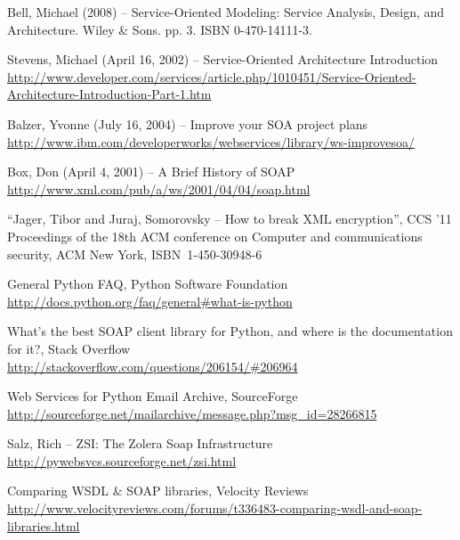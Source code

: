 

%
%

%
%


\begin{thebibliography}{99}

Bell, Michael (2008) -- Service-Oriented Modeling: Service Analysis, Design, and Architecture. Wiley & Sons. pp. 3. ISBN 0-470-14111-3.

Stevens, Michael (April 16, 2002) -- Service-Oriented Architecture Introduction
\url{http://www.developer.com/services/article.php/1010451/Service-Oriented-Architecture-Introduction-Part-1.htm}

Balzer, Yvonne (July 16, 2004) -- Improve your SOA project plans\\
\url{http://www.ibm.com/developerworks/webservices/library/ws-improvesoa/}

Box, Don (April 4, 2001) -- A Brief History of SOAP\\
\url{http://www.xml.com/pub/a/ws/2001/04/04/soap.html}

``Jager, Tibor and Juraj, Somorovsky -- How to break XML encryption'',
CCS '11 Proceedings of the 18th ACM conference on Computer and communications security,
ACM New York, \mbox{ISBN 1-450-30948-6}

General Python FAQ, Python Software Foundation\\
\url{http://docs.python.org/faq/general#what-is-python}

What's the best SOAP client library for Python, and where is the documentation for it?, Stack Overflow\\
\url{http://stackoverflow.com/questions/206154/#206964}

Web Services for Python Email Archive, SourceForge\\
\url{http://sourceforge.net/mailarchive/message.php?msg_id=28266815}

Salz, Rich -- ZSI: The Zolera Soap Infrastructure\\
\url{http://pywebsvcs.sourceforge.net/zsi.html}

Comparing WSDL & SOAP libraries, Velocity Reviews\\
\url{http://www.velocityreviews.com/forums/t336483-comparing-wsdl-and-soap-libraries.html}


\end{thebibliography}
